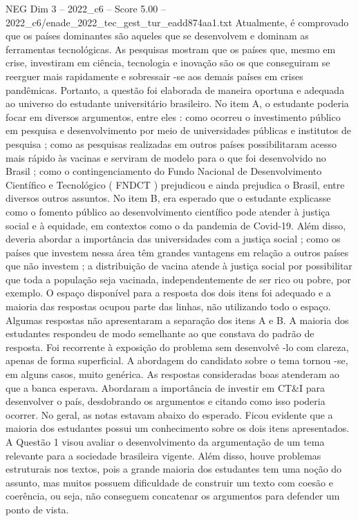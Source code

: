 \begin{textsample}{NEG Dim 3 – 2022\_c6 – Score 5.00 – 2022\_c6/enade\_2022\_tec\_gest\_tur\_eadd874aa1.txt}
Atualmente, é comprovado que os países dominantes são aqueles que se desenvolvem e dominam as ferramentas tecnológicas.
As pesquisas mostram que os países que, mesmo em crise, investiram em ciência, tecnologia e inovação são os que conseguiram se reerguer mais rapidamente e sobressair -se aos demais países em crises pandêmicas.
Portanto, a questão foi elaborada de maneira oportuna e adequada ao universo do estudante universitário brasileiro.
No item A, o estudante poderia focar em diversos argumentos, entre eles : como ocorreu o investimento público em pesquisa e desenvolvimento por meio de universidades públicas e institutos de pesquisa ; como as pesquisas realizadas em outros países possibilitaram acesso mais rápido às vacinas e serviram de modelo para o que foi desenvolvido no Brasil ; como o contingenciamento do Fundo Nacional de Desenvolvimento Científico e Tecnológico ( FNDCT ) prejudicou e ainda prejudica o Brasil, entre diversos outros assuntos.
No item B, era esperado que o estudante explicasse como o fomento público ao desenvolvimento científico pode atender à justiça social e à equidade, em contextos como o da pandemia de Covid-19.
Além disso, deveria abordar a importância das universidades com a justiça social ; como os países que investem nessa área têm grandes vantagens em relação a outros países que não investem ; a distribuição de vacina atende à justiça social por possibilitar que toda a população seja vacinada, independentemente de ser rico ou pobre, por exemplo.
O espaço disponível para a resposta dos dois itens foi adequado e a maioria das respostas ocupou parte das linhas, não utilizando todo o espaço.
Algumas respostas não apresentaram a separação dos itens A e B.
A maioria dos estudantes respondeu de modo semelhante ao que constava do padrão de resposta.
Foi recorrente à exposição do problema sem desenvolvê -lo com clareza, apenas de forma superficial.
A abordagem do candidato sobre o tema tornou -se, em alguns casos, muito genérica.
As respostas consideradas boas atenderam ao que a banca esperava.
Abordaram a importância de investir em CT\&I para desenvolver o país, desdobrando os argumentos e citando como isso poderia ocorrer.
No geral, as notas estavam abaixo do esperado.
Ficou evidente que a maioria dos estudantes possui um conhecimento sobre os dois itens apresentados.
A Questão 1 visou avaliar o desenvolvimento da argumentação de um tema relevante para a sociedade brasileira vigente.
Além disso, houve problemas estruturais nos textos, pois a grande maioria dos estudantes tem uma noção do assunto, mas muitos possuem dificuldade de construir um texto com coesão e coerência, ou seja, não conseguem concatenar os argumentos para defender um ponto de vista.

\end{textsample}
